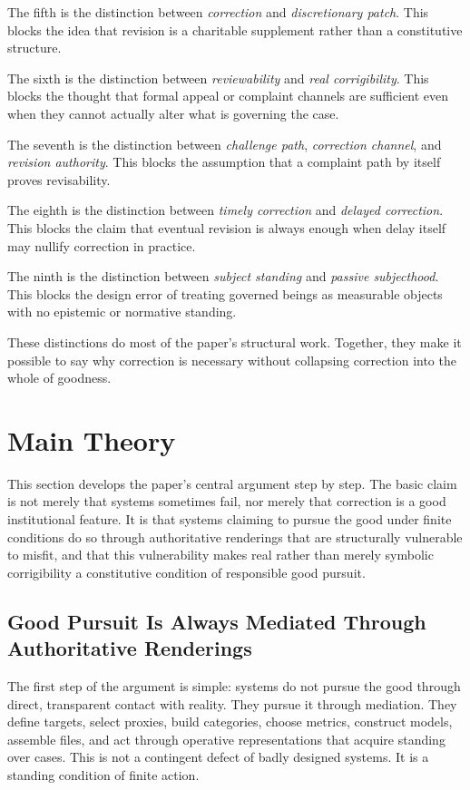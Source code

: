 \documentclass[11pt]{article}
\renewcommand{\emph}[1]{\textit{#1}}
\begin{document}
The fifth is the distinction between \emph{correction} and \emph{discretionary patch}. This blocks the idea that revision is a charitable supplement rather than a constitutive structure.

The sixth is the distinction between \emph{reviewability} and \emph{real corrigibility}. This blocks the thought that formal appeal or complaint channels are sufficient even when they cannot actually alter what is governing the case.

The seventh is the distinction between \emph{challenge path}, \emph{correction channel}, and \emph{revision authority}. This blocks the assumption that a complaint path by itself proves revisability.

The eighth is the distinction between \emph{timely correction} and \emph{delayed correction}. This blocks the claim that eventual revision is always enough when delay itself may nullify correction in practice.

The ninth is the distinction between \emph{subject standing} and \emph{passive subjecthood}. This blocks the design error of treating governed beings as measurable objects with no epistemic or normative standing.

These distinctions do most of the paper's structural work. Together, they make it possible to say why correction is necessary without collapsing correction into the whole of goodness.
\section{Main Theory}

This section develops the paper's central argument step by step. The basic claim is not merely that systems sometimes fail, nor merely that correction is a good institutional feature. It is that systems claiming to pursue the good under finite conditions do so through authoritative renderings that are structurally vulnerable to misfit, and that this vulnerability makes real rather than merely symbolic corrigibility a constitutive condition of responsible good pursuit.

\subsection{Good Pursuit Is Always Mediated Through Authoritative Renderings}

The first step of the argument is simple: systems do not pursue the good through direct, transparent contact with reality. They pursue it through mediation. They define targets, select proxies, build categories, choose metrics, construct models, assemble files, and act through operative representations that acquire standing over cases. This is not a contingent defect of badly designed systems. It is a standing condition of finite action.\cite{Scott1998SeeingLikeState,Swanson2026MediatedJudgmentConstraint}
\end{document}

